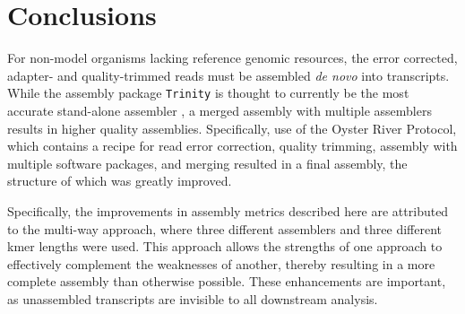 \documentclass[10pt,letterpaper]{article}
\begin{document}



\section{Conclusions}

For non-model organisms lacking reference genomic resources, the error corrected, adapter- and quality-trimmed reads must be assembled \textit{de novo} into transcripts. While the assembly package \texttt{Trinity} \citep{Haas:2013jq} is thought to currently be the most accurate stand-alone assembler \citep{Li:2014cm}, a merged assembly with multiple assemblers results in higher quality assemblies. Specifically, use of the Oyster River Protocol, which contains a recipe for read error correction, quality trimming, assembly with multiple software packages, and merging resulted in a final assembly, the structure of which was greatly improved. 

Specifically, the improvements in assembly metrics described here are attributed to the multi-way approach, where three different assemblers and three different kmer lengths were used. This approach allows the strengths of one approach to effectively complement the weaknesses of another, thereby resulting in a more complete assembly than otherwise possible. These enhancements are important, as unassembled transcripts are invisible to all downstream analysis.      
 
\end{document}
